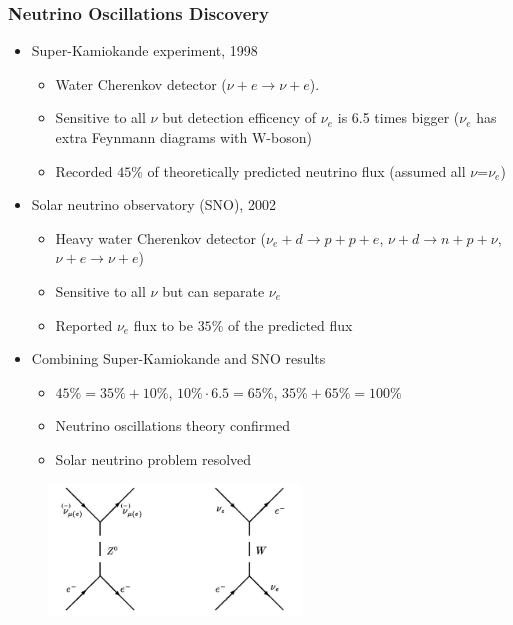 \begin{frame}\frametitle{Neutrino Oscillations Discovery}
\begin{itemize}
  \scriptsize
  \item Super-Kamiokande experiment, 1998 
  \begin{itemize}
     \scriptsize
     \item Water Cherenkov detector ($\nu + e \rightarrow \nu + e$). 
     \item Sensitive to all $\nu$ but detection efficency of $\nu_e$ is 6.5 times bigger ($\nu_e$ has extra Feynmann diagrams with W-boson)
     \item Recorded $45\%$ of theoretically predicted neutrino flux (assumed all $\nu$=$\nu_e$)
  \end{itemize}
  \scriptsize
  \item Solar neutrino observatory (SNO), 2002
  \tiny
  \begin{itemize}
     \scriptsize
     \item Heavy water Cherenkov detector ($\nu_e + d \rightarrow p+p+e$, $\nu+d \rightarrow n+p+\nu$, $\nu+e \rightarrow \nu+e$)
     \item Sensitive to all $\nu$ but can separate $\nu_e$
     \item Reported $\nu_e$ flux to be $35\%$ of the predicted flux
  \end{itemize}
  \scriptsize
  \item Combining Super-Kamiokande and SNO results
  \begin{itemize}
     \scriptsize
     \item $45\%=35\%+10\%$, $10\% \cdot 6.5 = 65\%$, $35\%+65\%=100\%$
     \item Neutrino oscillations theory confirmed
     \item Solar neutrino problem resolved
  \end{itemize}
\end{itemize} 
\begin{figure}
\label{fig:NuScattering}
\centering
\includegraphics[width=0.60\textwidth, keepaspectratio=true]{figs/nuScattering_Only2.png}
\end{figure}
\end{frame}

